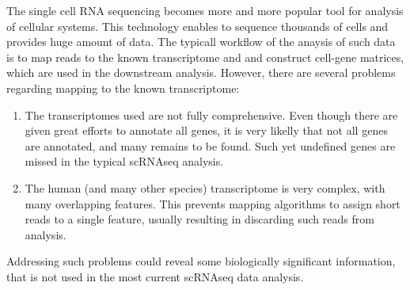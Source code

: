 The single cell RNA sequencing becomes more and more popular tool for analysis of cellular systems.
This technology enables to sequence thousands of cells and provides huge amount of data.
The typicall workflow of the anaysis of such data is to map reads to the known transcriptome and and construct cell-gene matrices,
which are used in the downstream analysis.
However, there are several problems regarding mapping to the known transcriptome:

\begin{enumerate}
  \item The transcriptomes used are not fully comprehensive.
  Even though there are given great efforts to annotate all genes, it is very likelly that not all genes are annotated,
  and many remains to be found.
  Such yet undefined genes are missed in the typical scRNAseq analysis.
  \item The human (and many other species) transcriptome is very complex, with many overlapping features.
  This prevents mapping algorithms to assign short reads to a single feature, usually resulting in discarding such reads from analysis.
\end{enumerate}

Addressing such problems could reveal some biologically significant information, that is not used in the most current scRNAseq data analysis.
